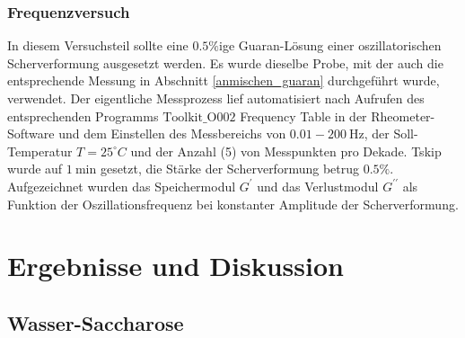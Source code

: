 \documentclass[11pt,a4paper,oneside]{scrartcl}
\begin{document}
\subsubsection{Frequenzversuch}
In diesem Versuchsteil sollte eine $0.5\%$ige Guaran-Lösung einer oszillatorischen Scherverformung ausgesetzt werden. Es wurde dieselbe Probe, mit der auch die entsprechende Messung in Abschnitt \ref{anmischen_guaran} durchgeführt wurde, verwendet. Der eigentliche Messprozess lief automatisiert nach Aufrufen des entsprechenden Programms $\mathrm{Toolkit\_O002}$ Frequency Table in der Rheometer-Software und dem Einstellen des Messbereichs von $0.01-200\ \mathrm{Hz}$, der Soll-Temperatur $T=25^\circ C$ und der Anzahl (5) von Messpunkten pro Dekade. Tskip wurde auf $1\ \mathrm{min}$ gesetzt, die Stärke der Scherverformung betrug $0.5\%$.\\
Aufgezeichnet wurden das Speichermodul $G^\prime$ und das Verlustmodul $G^{\prime\prime}$ als Funktion der Oszillationsfrequenz bei konstanter Amplitude der Scherverformung.
\newpage
\section{Ergebnisse und Diskussion}
\subsection{Wasser-Saccharose}
\end{document}
